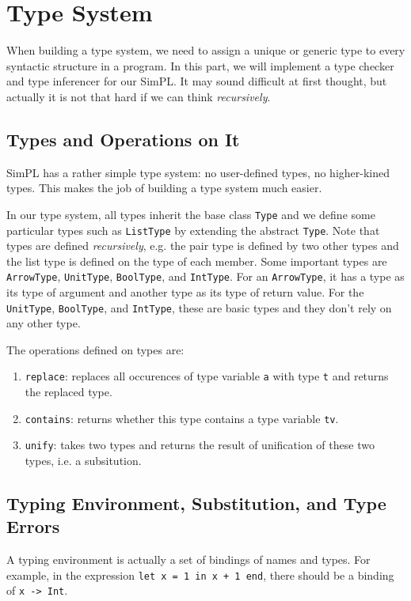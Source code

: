 \documentclass{article}
\begin{document}
\section{Type System}
When building a type system, we need to assign a unique or generic type to every syntactic structure in a program. In this part, we will implement a type checker and type inferencer for our SimPL. It may sound difficult at first thought, but actually it is not that hard if we can think \emph{recursively}.
\subsection{Types and Operations on It}
SimPL has a rather simple type system: no user-defined types, no higher-kined types. This makes the job of building a type system much easier.

In our type system, all types inherit the base class \verb|Type| and we define some particular types such as \verb|ListType| by extending the abstract \verb|Type|. Note that types are defined \emph{recursively}, e.g. the pair type is defined by two other types and the list type is defined on the type of each member. Some important types are \verb|ArrowType|, \verb|UnitType|, \verb|BoolType|, and \verb|IntType|. For an \verb|ArrowType|, it has a type as its type of argument and another type as its type of return value. For the \verb|UnitType|, \verb|BoolType|, and \verb|IntType|, these are basic types and they don't rely on any other type.

The operations defined on types are:
\begin{enumerate}
	\item \verb|replace|: replaces all occurences of type variable \verb|a| with type \verb|t| and returns the replaced type.
	\item \verb|contains|: returns whether this type contains a type variable \verb|tv|.
	\item \verb|unify|: takes two types and returns the result of unification of these two types, i.e. a subsitution.
\end{enumerate}

\subsection{Typing Environment, Substitution, and Type Errors}
A typing environment is actually a set of bindings of names and types. For example, in the expression \verb|let x = 1 in x + 1 end|, there should be a binding of \verb|x -> Int|. 
\end{document}
